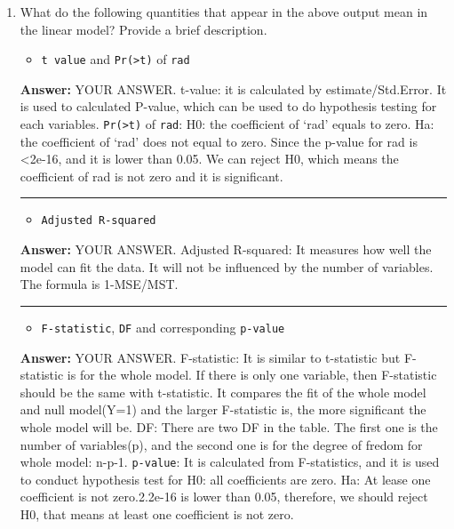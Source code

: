 \documentclass[
]{article}
\providecommand{\tightlist}{%
  \setlength{\itemsep}{0pt}\setlength{\parskip}{0pt}}
\begin{document}
\begin{enumerate}
\def\labelenumi{(\roman{enumi})}
\item
  What do the following quantities that appear in the above output mean
  in the linear model? Provide a brief description.

  \begin{itemize}
  \tightlist
  \item
    \texttt{t\ value} and
    \texttt{Pr(\textgreater{}\textbar{}t\textbar{})} of \texttt{rad}
  \end{itemize}

  \textbf{Answer:} YOUR ANSWER. t-value: it is calculated by
  estimate/Std.Error. It is used to calculated P-value, which can be
  used to do hypothesis testing for each variables.
  \texttt{Pr(\textgreater{}\textbar{}t\textbar{})} of \texttt{rad}: H0:
  the coefficient of `rad' equals to zero. Ha: the coefficient of `rad'
  does not equal to zero. Since the p-value for rad is \textless2e-16,
  and it is lower than 0.05. We can reject H0, which means the
  coefficient of rad is not zero and it is significant.

  \begin{center}\rule{0.5\linewidth}{\linethickness}\end{center}

  \begin{itemize}
  \tightlist
  \item
    \texttt{Adjusted\ R-squared}
  \end{itemize}

  \textbf{Answer:} YOUR ANSWER. Adjusted R-squared: It measures how well
  the model can fit the data. It will not be influenced by the number of
  variables. The formula is 1-MSE/MST.

  \begin{center}\rule{0.5\linewidth}{\linethickness}\end{center}

  \begin{itemize}
  \tightlist
  \item
    \texttt{F-statistic}, \texttt{DF} and corresponding \texttt{p-value}
  \end{itemize}

  \textbf{Answer:} YOUR ANSWER. F-statistic: It is similar to
  t-statistic but F-statistic is for the whole model. If there is only
  one variable, then F-statistic should be the same with t-statistic. It
  compares the fit of the whole model and null model(Y=1) and the larger
  F-statistic is, the more significant the whole model will be. DF:
  There are two DF in the table. The first one is the number of
  variables(p), and the second one is for the degree of fredom for whole
  model: n-p-1. \texttt{p-value}: It is calculated from F-statistics,
  and it is used to conduct hypothesis test for H0: all coefficients are
  zero. Ha: At lease one coefficient is not zero.2.2e-16 is lower than
  0.05, therefore, we should reject H0, that means at least one
  coefficient is not zero.


\end{enumerate}
\end{document}
